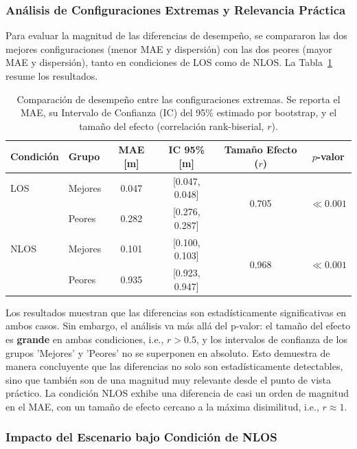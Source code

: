 \subsubsection{Análisis de Configuraciones Extremas y Relevancia Práctica}

Para evaluar la magnitud de las diferencias de desempeño, se compararon las dos mejores configuraciones (menor MAE y dispersión) con las dos peores (mayor MAE y dispersión), tanto en condiciones de LOS como de NLOS. La Tabla~\ref{tab:extremos} resume los resultados.
%
\begin{table}[t]
\centering
\caption{Comparación de desempeño entre las configuraciones extremas. Se reporta el MAE, su Intervalo de Confianza (IC) del 95\% estimado por bootstrap, y el tamaño del efecto (correlación rank-biserial, $r$).}
\label{tab:extremos}
\begin{tabular}{llcccc}
\toprule
\rowcolor{headerblue}
\textbf{Condición} & \textbf{Grupo} & \textbf{MAE [m]} & \textbf{IC 95\% [m]} & \textbf{Tamaño Efecto ($r$)} & \textbf{$p$-valor} \\
\midrule
\addlinespace
LOS & Mejores & 0.047 & [0.047, 0.048] & \multirow{2}{*}{0.705} & \multirow{2}{*}{$\ll 0.001$} \\
 & Peores & 0.282 & [0.276, 0.287] & & \\
\addlinespace
\midrule
\addlinespace
NLOS & Mejores & 0.101 & [0.100, 0.103] & \multirow{2}{*}{0.968} & \multirow{2}{*}{$\ll 0.001$} \\
 & Peores & 0.935 & [0.923, 0.947] & & \\
\bottomrule
\end{tabular}
\end{table}
%
Los resultados muestran que las diferencias son estadísticamente significativas en ambos casos. Sin embargo, el análisis va más allá del p-valor: el tamaño del efecto es \textbf{grande} en ambas condiciones, i.e., $r > 0.5$, y los intervalos de confianza de los grupos 'Mejores' y 'Peores' no se superponen en absoluto. Esto demuestra de manera concluyente que las diferencias no solo son estadísticamente detectables, sino que también son de una magnitud muy relevante desde el punto de vista práctico. La condición NLOS exhibe una diferencia de casi un orden de magnitud en el MAE, con un tamaño de efecto cercano a la máxima disimilitud, i.e., $r \approx 1$.

\subsubsection{Impacto del Escenario bajo Condición de NLOS}

